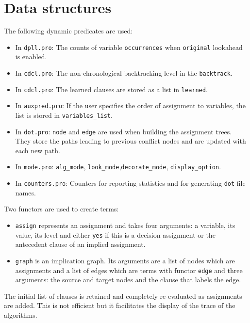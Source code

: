 \documentclass[11pt]{article}
\newcommand*{\p}[1]{\textup{\texttt{#1}}}
\begin{document}
\section{Data structures}

The following dynamic predicates are used:
\begin{itemize}

\item In \p{dpll.pro}: The counts of variable \p{occurrences} when \p{original} lookahead is enabled.

\item In \p{cdcl.pro}: The non-chronological backtracking level in the \p{backtrack}.

\item In \p{cdcl.pro}: The learned clauses are stored as a list in \p{learned}.

\item In \p{auxpred.pro}: If the user specifies the order of assignment
to variables, the list is stored in \p{variables\_list}.

\item In \p{dot.pro}: \p{node} and \p{edge} are used when building the assignment trees. They store the paths leading to previous conflict nodes and are updated with each new path.

\item In \p{mode.pro}: \p{alg\_mode}, \p{look\_mode},\p{decorate\_mode}, \p{display\_option}.

\item In \p{counters.pro}: Counters for reporting statistics and for generating \p{dot} file names.
\end{itemize}

Two functors are used to create terms:
\begin{itemize}

\item \p{assign} represents an assignment and takes four arguments: a
variable, its value, its level and either \p{yes} if this is a decision
assignment or the antecedent clause of an implied assignment.

\item \p{graph} is an implication graph. Its arguments are a list of
nodes which are assignments and a list of edges which are terms with
functor \p{edge} and three arguments: the source and target nodes
and the clause that labels the edge.
\end{itemize}

The initial list of clauses is retained and completely re-evaluated as assignments are added. This is not efficient but it facilitates the display of the trace of the algorithms.
\end{document}

